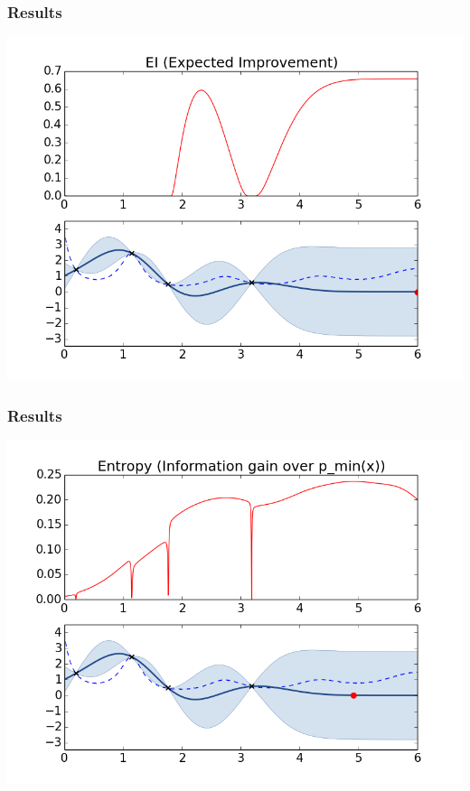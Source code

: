 \documentclass[10pt,handout]{beamer}
\begin{document}
\begin{frame}
\frametitle{Results}
\includegraphics[width=\textwidth]{EI.png}
\end{frame}
\begin{frame}
\frametitle{Results}
\includegraphics[width=\textwidth]{Entropy.png}
\end{frame}
\end{document}
